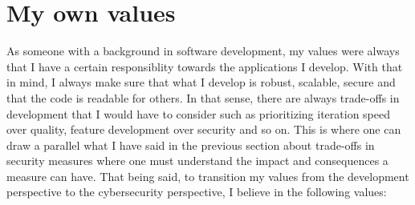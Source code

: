 \documentclass[12pt]{article}
\begin{document}
\section{My own values}
As someone with a background in software development, my values were always that I have a certain responsiblity towards the applications I develop. With that in mind, I always make sure that what I develop is robust, scalable, secure and that the code is readable for others.
\newline
In that sense, there are always trade-offs in development that I would have to consider such as prioritizing iteration speed over quality, feature development over security and so on. This is where one can draw a parallel what I have said in the previous section about trade-offs in security measures where one must understand the impact and consequences a measure can have.
\newline
That being said, to transition my values from the development perspective to the cybersecurity perspective, I believe in the following values:
\end{document}
